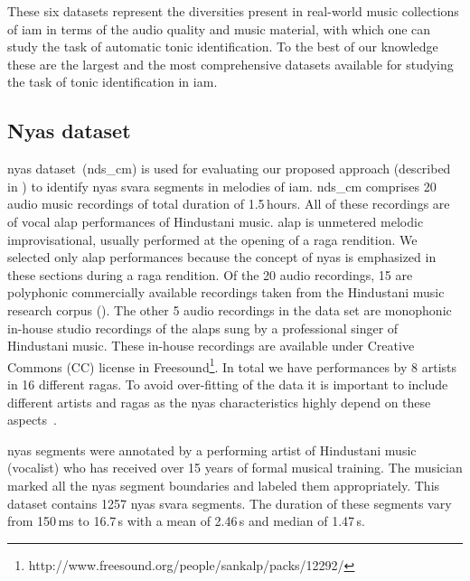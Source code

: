 {These six datasets represent the diversities present in real-world music collections of \gls{iam} in terms of the audio quality and music material, with which one can study the task of automatic tonic identification. To the best of our knowledge these are the largest and the most comprehensive datasets available for studying the task of tonic identification in \gls{iam}. 



\subsection{Nyas dataset}
\label{sec:corpus_nyas_dataset}

\Gls{nyas} dataset~(\acrshort{nds_cm}) is used for evaluating our proposed approach (described in ) to identify \gls{nyas} \gls{svara} segments in melodies of \gls{iam}. \acrshort{nds_cm} comprises 20 audio music recordings of total duration of 1.5\,hours. All of these recordings are of vocal \gls{alap} performances of Hindustani music. \Gls{alap} is unmetered melodic improvisational, usually performed at the opening of a \gls{raga} rendition. We selected only \gls{alap} performances because the concept of \gls{nyas} is emphasized in these sections during a \gls{raga} rendition. Of the 20 audio recordings, 15 are polyphonic commercially available recordings taken from the Hindustani music research corpus (). The other 5 audio recordings in the data set are monophonic in-house studio recordings of the \glspl{alap} sung by a professional singer of Hindustani music. These in-house recordings are available under Creative Commons (CC) license in Freesound\footnote{http://www.freesound.org/people/sankalp/packs/12292/}. In total we have performances by 8 artists in 16 different \glspl{raga}. To avoid over-fitting of the data it is important to include different artists and \glspl{raga} as the \gls{nyas} characteristics highly depend on these aspects~\cite{Dey2008}.

\Gls{nyas} segments were annotated by a performing artist of Hindustani music (vocalist) who has received over 15 years of formal musical training. The musician marked all the \gls{nyas} segment boundaries and labeled them appropriately. This dataset contains 1257 \gls{nyas} \gls{svara} segments. The duration of these segments vary from 150\,ms to 16.7\,s with a mean of 2.46\,s and median of 1.47\,s.



}
